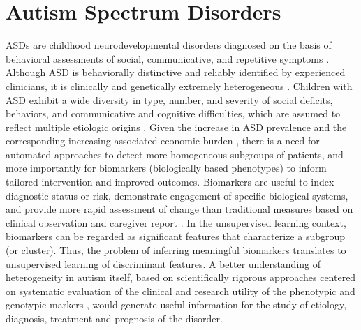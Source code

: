 \documentclass{bmcart}
\begin{document}



\section*{Autism Spectrum Disorders}
\label{sec:asd}

ASDs are childhood neurodevelopmental disorders diagnosed on the basis of behavioral assessments of social, communicative, and repetitive symptoms \cite{DSM}. Although ASD is behaviorally distinctive and reliably identified by experienced clinicians, it is clinically and genetically extremely heterogeneous \cite{miles2011autism}. Children with ASD exhibit a wide diversity in type, number, and severity of social deficits, behaviors, and communicative and cognitive difficulties, which are assumed to reflect multiple etiologic origins \cite{eaves1994subtypes}. Given the increase in ASD prevalence \cite{autism2014prevalence} and the corresponding increasing associated economic burden \cite{lavelle2014economic}, there is a need for automated approaches to detect more homogeneous subgroups of patients, and more importantly for biomarkers (biologically based phenotypes) to inform tailored intervention and improved outcomes. Biomarkers are useful to index diagnostic status or risk, demonstrate engagement of specific biological systems, and provide more rapid assessment of change than traditional measures based on clinical observation and caregiver report \cite{mcpartland2016considerations}. 
In the unsupervised learning context, biomarkers can be regarded as significant features that characterize a subgroup (or cluster). Thus, the problem of inferring meaningful biomarkers translates to unsupervised learning of discriminant features. 
A better understanding of heterogeneity in autism itself, based on scientifically rigorous approaches centered on systematic evaluation of the clinical and research utility of the phenotypic and genotypic markers \cite{georgiades2013importance}, would generate useful information for the study of etiology, diagnosis, treatment and prognosis of the disorder. 
\end{document}
